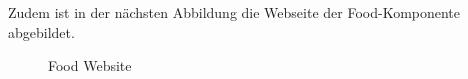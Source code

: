  Zudem ist in der nächsten Abbildung die Webseite der Food-Komponente abgebildet.
 \begin{figure}[htbp]
 	\centering
 	\caption{Food Website}
 \end{figure}
